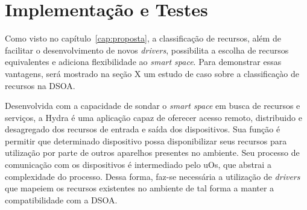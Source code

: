 \chapter{Implementação e Testes}

Como visto no capítulo~\ref{cap:proposta}, a classificação de recursos, além de facilitar o desenvolvimento de novos \emph{drivers}, possibilita a escolha de recursos equivalentes e adiciona flexibilidade ao \emph{smart space}. Para demonstrar essas vantagens, será mostrado na seção X um estudo de caso sobre a classificaçào de recursos na DSOA.



Desenvolvida com a capacidade de sondar o \emph{smart space} em busca de recursos e serviços, a Hydra é uma aplicação capaz de oferecer acesso remoto, distribuido e desagregado dos recursos de entrada e saída dos dispositivos. Sua função é permitir que determinado dispositivo possa disponibilizar seus recursos para utilização por parte de outros aparelhos presentes no ambiente. Seu processo de comunicação com os dispositivos é intermediado pelo uOs, que abstrai a complexidade do processo. Dessa forma, faz-se necessária a utilização de \emph{drivers} que mapeiem os recursos existentes no ambiente de tal forma a manter a compatibilidade com a DSOA.

\begin{comment}
A Hydra consiste em uma aplicação construída com o objetivo de explorar a forma como o ambiente é decomposto em recursos e serviços para possibilitar uma forma desagregada de acesso a recursos de entrada e saída dos dispositivos. Seu objetivo é permitir que um determinado dispositivo tenha seus recursos de entrada e saída redirecionados para outros dispositivos, repassando a estes o controle de sua operação.

A Hydra, trabalhando sobre o middleware uOS, percebe o ambiente como um conjunto
de recursos presentes. A comunicação entre a Hydra os recursos ocorre com intermédio do
uOS, abstraindo tanto da Hydra quando dos drivers o outro ponto de comunicação. Para
os drivers, não importa para quem estão sendo prestados os serviços, e cabe à aplicação
a escolha entre os recursos do ambiente.

Por trabalhar com os conceitos da DSOA (Seção 3.1), a Hydra vê os recursos do
ambiente de forma transparente, e pode fazer uso de qualquer recurso compatível com as
interfaces por ele esperadas e permite que outros dispositivos utilizem os mesmos recursos
do ambiente.

A aplicação Hydra se propõe a reconhecer determinados drivers e redirecionar seus
serviços corretamente.
\end{comment}

